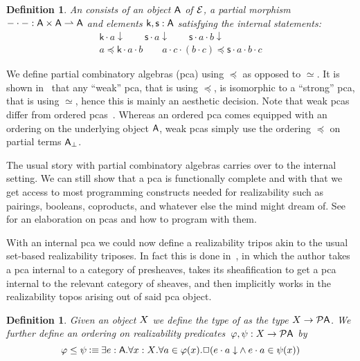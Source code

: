 \documentclass{easychair}
\newtheorem{defn}[thrm]{Definition}
\begin{document}
\begin{defn}
  An  consists of
  an object \(\mathsf{A}\) of \(\mathcal{E}\), a partial morphism
  \(-\cdot-:\mathsf{A} \times \mathsf{A} \rightharpoonup \mathsf{A}\) and elements
  \(\mathsf{k},\mathsf{s} : \mathsf{A}\) satisfying the internal
  statements:
  \[\begin{array}{c}
      \mathsf{k} \cdot a \downarrow \qquad
      \mathsf{s} \cdot a \downarrow \qquad
      \mathsf{s} \cdot a \cdot b \downarrow \\
      a \preccurlyeq \mathsf{k} \cdot a \cdot b \qquad
      a \cdot c \cdot (b \cdot c) \preccurlyeq \mathsf{s} \cdot a \cdot b \cdot c
  \end{array}\]
\end{defn}

We define partial combinatory algebras (pca) using \(\preccurlyeq\) as opposed
to \(\simeq\).
%
It is shown in~\cite{faberEffectiveOperationsType2016} that any
``weak'' pca, that is using \(\preccurlyeq\), is isomorphic to a ``strong'' pca,
that is using \(\simeq\), hence this is mainly an aesthetic decision.
%
Note that weak pcas differ from ordered
pcas~\cite[\S1.8]{oostenRealizabilityIntroductionIts2008}.
%
Whereas an ordered pca comes equipped with an ordering on the underlying object
\(\mathsf{A}\), weak pcas simply use the ordering \(\preccurlyeq\) on partial
terms \(\mathsf{A}_{\bot}\).

The usual story with partial combinatory algebras carries over to the
internal setting.
%
We can still show that a pca is functionally complete and with that we get
access to most programming constructs needed for realizability such as pairings,
booleans, coproducts, and whatever else the mind might dream of.
%
See~\cite[\S 1.1]{oostenRealizabilityIntroductionIts2008} for an elaboration on pcas and
how to program with them.

With an internal pca we could now define a realizability tripos akin to the
usual set-based realizability triposes.
%
In fact this is done in~\cite{vanoostenSemanticalProofJonghs1991}, in which the
author takes a pca internal to a category of presheaves, takes its
sheafification to get a pca internal to the relevant category of sheaves, and
then implicitly works in the realizability topos arising out of said pca object.

\begin{defn}
  Given an object \(X\) we define the type of  as the type \({{X}\to{\mathcal{P}{\ensuremath{\mathsf{A}}}}}\).
  We further define an ordering on realizability
  predicates~\(\varphi, \psi : {{X}\to{\mathcal{P}{\ensuremath{\mathsf{A}}}}}\) by
  \[
    \varphi \leq \psi
    \IsDefined
    \IExists{e : \A}{
      \IForall{x : \X}{
        \IForall{a \in \varphi(x)}{
          \IBox{(
            \IAnd%
            {\ITotal{\IAp{e}{a}}}%
            {\IAp{e}{a} \in \psi(x)}
          )}
        }
      }
    }
  \]
\end{defn}
\end{document}
